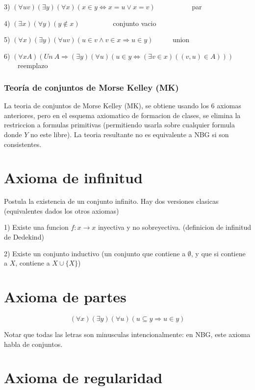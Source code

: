 \documentclass[12pt]{article}
\begin{document}
3) $(\forall uv) (\exists y) (\forall x) (x \in y \Leftrightarrow x = u \vee x = v)$ \ \ \ \ \ \ \ \ \ \ par

4) $(\exists x) (\forall y) (y \notin x)$ \ \ \ \ \ \ \ \ \  conjunto vacio

5) $(\forall x) (\exists y) (\forall uv) (u \in v \wedge v \in x \Rightarrow u \in y)$  \ \ \ \ \ union

6) $(\forall xA) (Un \ A \Rightarrow (\exists y) (\forall u) (u \in y \Leftrightarrow (\exists v \in x)( (v,u) \in A)))$ \ \ \ \ reemplazo

\subsubsection{Teoría de conjuntos de Morse Kelley (MK)}

La teoria de conjuntos de Morse Kelley (MK), se obtiene usando los 6 axiomas anteriores, pero en el esquema axiomatico de formacion de clases,
se elimina la restriccion a formulas primitivas (permitiendo usarla sobre cualquier formula donde $Y$ no este libre). La teoria resultante no
es equivalente a NBG si son consistentes.

\section{Axioma de infinitud}

Postula la existencia de un conjunto infinito. Hay dos versiones clasicas (equivalentes dados los otros axiomas)

1) Existe una funcion $f : x \rightarrow x $ inyectiva y no sobreyectiva. (definicion de infinitud de Dedekind)

2) Existe un conjunto inductivo (un conjunto que contiene a $\emptyset$, y que si contiene a $X$, contiene a $X \cup \{X \}$)

\section{Axioma de partes}

$$(\forall x)(\exists y) (\forall u) (u \subseteq y \Rightarrow u \in y)$$

Notar que todas las letras son minusculas intencionalmente: en NBG, este axioma habla de conjuntos.

\section{Axioma de regularidad}
\end{document}
